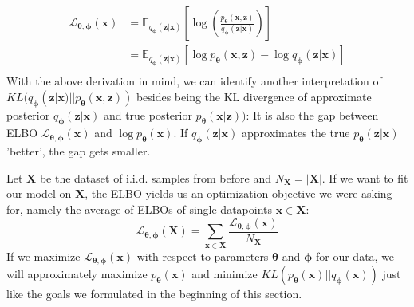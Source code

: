 \documentclass[12pt]{report}
\theoremstyle{definition}
\begin{document}
\begin{equation}
\begin{split}
	\mathcal{L}_{\mathbf{\theta}, \mathbf{\phi}}(\mathbf{x}) 
	& = \mathbb{E}_{q_{\mathbf{\phi}}(\mathbf{z}|\mathbf{x})}\left[ \log\left(\frac{p_{\mathbf{\theta}}(\mathbf{x}, \mathbf{z})}{q_{\mathbf{\phi}}(\mathbf{z}|\mathbf{x})}\right) \right] \\
	& = \mathbb{E}_{q_{\mathbf{\phi}}(\mathbf{z}|\mathbf{x})}\left[ \log p_{\mathbf{\theta}}(\mathbf{x}, \mathbf{z}) - \log q_{\mathbf{\phi}}(\mathbf{z}|\mathbf{x}) \right]	\\
\end{split}
\end{equation}
With the above derivation in mind, we can identify another interpretation of $KL(q_{\mathbf{\phi}}(\mathbf{z}|\mathbf{x}) || p_{\mathbf{\theta}}(\mathbf{x}, \mathbf{z}))$ besides being the KL divergence of approximate posterior $q_{\mathbf{\phi}}(\mathbf{z}|\mathbf{x})$ and true posterior $p_{\mathbf{\theta}}(\mathbf{x}| \mathbf{z}))$: It is also the gap between ELBO $\mathcal{L}_{\mathbf{\theta}, \mathbf{\phi}}(\mathbf{x})$ and $\log p_{\mathbf{\theta}}(\mathbf{x})$. If $q_{\mathbf{\phi}}(\mathbf{z}|\mathbf{x})$ approximates the true $p_{\mathbf{\theta}}(\mathbf{z}|\mathbf{x})$ 'better', the gap gets smaller.

Let $\mathbf{X}$ be the dataset of i.i.d. samples from before and $N_{\mathbf{X}} = |\mathbf{X}|$. If we want to fit our model on $\mathbf{X}$, the ELBO yields us an optimization objective we were asking for, namely the average of ELBOs of single datapoints $\mathbf{x} \in \mathbf{X}$:
\begin{equation}
	\mathcal{L}_{\mathbf{\theta}, \mathbf{\phi}}(\mathbf{X}) = \sum_{\mathbf{x} \in \mathbf{X}} \frac{\mathcal{L}_{\mathbf{\theta}, \mathbf{\phi}}(\mathbf{x})}{N_{\mathbf{X}}}
\end{equation}
If we maximize $\mathcal{L}_{\mathbf{\theta}, \mathbf{\phi}}(\mathbf{x})$ with respect to parameters $\pmb{\theta}$ and $\pmb{\phi}$ for our data, we will approximately maximize $p_{\mathbf{\theta}}(\mathbf{x})$ and minimize $KL(p_{\mathbf{\theta}}(\mathbf{x}) || q_{\mathbf{\phi}}(\mathbf{x}))$ just like the goals we formulated in the beginning of this section.
\end{document}

